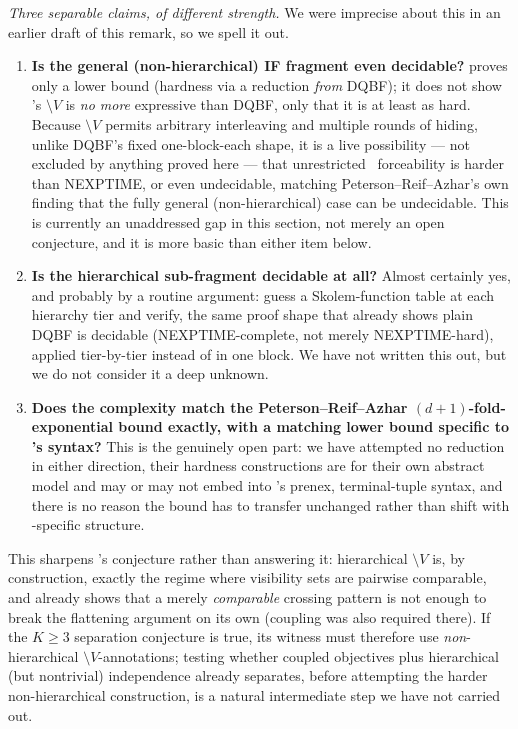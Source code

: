 \begin{remark}
\emph{Three separable claims, of different strength.} We were imprecise
about this in an earlier draft of this remark, so we spell it out.
\begin{enumerate}[nosep]
  \item \textbf{Is the general (non-hierarchical) IF fragment even
  decidable?}  proves only a lower bound (hardness via
  a reduction \emph{from} DQBF); it does not show \KFOL's $\setminus V$ is
  \emph{no more} expressive than DQBF, only that it is at least as hard.
  Because $\setminus V$ permits arbitrary interleaving and multiple rounds of
  hiding, unlike DQBF's fixed one-block-each shape, it is a live possibility
  --- not excluded by anything proved here --- that unrestricted \KFOL\
  forceability is harder than NEXPTIME, or even undecidable, matching
  Peterson--Reif--Azhar's own finding that the fully general (non-hierarchical)
  case can be undecidable. This is currently an unaddressed gap in this
  section, not merely an open conjecture, and it is more basic than either
  item below.
  \item \textbf{Is the hierarchical sub-fragment decidable at all?} Almost
  certainly yes, and probably by a routine argument: guess a Skolem-function
  table at each hierarchy tier and verify, the same proof shape that already
  shows plain DQBF is decidable (NEXPTIME-complete, not merely
  NEXPTIME-hard), applied tier-by-tier instead of in one block. We have not
  written this out, but we do not consider it a deep unknown.
  \item \textbf{Does the complexity match the Peterson--Reif--Azhar
  $(d{+}1)$-fold-exponential bound exactly, with a matching lower bound
  specific to \KFOL's syntax?} This is the genuinely open part: we have
  attempted no reduction in either direction, their hardness constructions
  are for their own abstract model and may or may not embed into \KFOL's
  prenex, terminal-tuple syntax, and there is no reason the bound has to
  transfer unchanged rather than shift with \KFOL-specific structure.
\end{enumerate}

This sharpens 's conjecture rather than
answering it: hierarchical $\setminus V$ is, by construction, exactly the
regime where visibility sets are pairwise comparable, and
 already shows that a merely
\emph{comparable} crossing pattern is not enough to break the flattening
argument on its own (coupling was also required there). If the $K\ge 3$
separation conjecture is true, its witness must therefore use \emph{non}-hierarchical
$\setminus V$-annotations; testing whether coupled objectives plus
hierarchical (but nontrivial) independence already separates, before
attempting the harder non-hierarchical construction, is a natural
intermediate step we have not carried out.
\end{remark}

